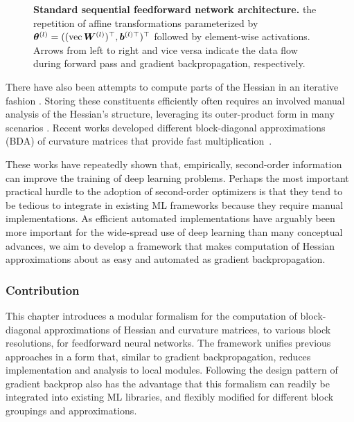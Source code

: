 \begin{figure*}[t]
  \centering\resizebox{\linewidth}{!}{
    \tikzexternalenable
    {\footnotesize
      
    }
    \tikzexternaldisable}
  \caption{\textbf{Standard sequential feedforward network architecture.} \Ie the
    repetition of affine transformations parameterized by $ {\bm{\theta}}^{(l)} =
    ((\operatorname{vec} {\bm{W}}^{(l)})^{\top}, {\bm{b}}^{(l)\top})^{\top}$ followed by element-wise
    activations. Arrows from left to right and vice versa indicate the data flow
    during forward pass and gradient backpropagation, respectively.}
  \label{hbp::fig:setting}
\end{figure*}

There have also been attempts to compute parts of the Hessian in an iterative
fashion \citep{mizutani2008secondorder}. Storing these constituents efficiently
often requires an involved manual analysis of the Hessian's structure,
leveraging its outer-product form in many scenarios
\citep{naumov2017HessianInMatrixForm, bakker2018OuterProductStructure}. Recent
works developed different block-diagonal approximations (BDA) of curvature
matrices that provide fast
multiplication~\citep{martens2015optimizing,grosse2016kronecker,botev2017practical,wei2018bdapch}.

These works have repeatedly shown that, empirically, second-order information
can improve the training of deep learning problems. Perhaps the most important
practical hurdle to the adoption of second-order optimizers is that they tend to
be tedious to integrate in existing ML frameworks because they require manual
implementations. As efficient automated implementations have arguably been more
important for the wide-spread use of deep learning than many conceptual
advances, we aim to develop a framework that makes computation of Hessian
approximations about as easy and automated as gradient backpropagation.

\subsubsection{Contribution}

This chapter introduces a modular formalism for the computation of
block-diagonal approximations of Hessian and curvature matrices, to various
block resolutions, for feedforward neural networks. The framework unifies
previous approaches in a form that, similar to gradient backpropagation, reduces
implementation and analysis to local modules. Following the design pattern of
gradient backprop also has the advantage that this formalism can readily be
integrated into existing ML libraries, and flexibly modified for
different block groupings and approximations.

